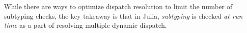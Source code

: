 While there are ways to optimize dispatch resolution to limit the number of
subtyping checks, the key takeaway is that %
in Julia, \emph{subtyping} is checked \emph{at run time} as a part of
resolving multiple dynamic dispatch.

